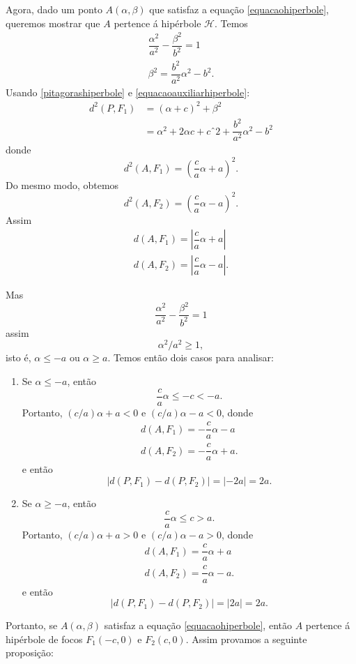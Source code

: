Agora, dado um ponto $A(\alpha,\beta)$ que satisfaz a equação \eqref{equacaohiperbole}, queremos mostrar que $A$ pertence á hipérbole $\mathcal{H}$. Temos
\begin{align}
  \dfrac{\alpha^2}{a^2} - \dfrac{\beta^2}{b^2} = 1\nonumber\\
  \beta^2 = \dfrac{b^2}{a^2}\alpha^2 - b^2.\label{equacaoauxiliarhiperbole}
\end{align}
Usando \eqref{pitagorashiperbole} e \eqref{equacaoauxiliarhiperbole}:
\begin{align*}
  d^2(P,F_1) &= (\alpha + c)^2 + \beta^2\\
  &= \alpha^2 + 2\alpha c + cˆ2 + \dfrac{b^2}{a^2}\alpha^2 - b^2
\end{align*}
donde
\[
  d^2(A,F_1) = \left(\dfrac{c}{a}\alpha + a\right)^2.
\]
Do mesmo modo, obtemos
\[
  d^2(A,F_2) = \left(\dfrac{c}{a}\alpha - a\right)^2.
\]
Assim
\begin{align}
  d(A,F_1) = \left|\dfrac{c}{a}\alpha + a\right|\\
  d(A,F_2) = \left|\dfrac{c}{a}\alpha - a\right|.
\end{align}

Mas
\[
  \dfrac{\alpha^2}{a^2} - \dfrac{\beta^2}{b^2} = 1
\]
assim
\begin{equation}\label{pontohiperbole}
  \alpha^2/a^2 \ge 1,
\end{equation}
isto é, $\alpha \le -a$ ou $\alpha \ge a$. Temos então dois casos para analisar:
\begin{enumerate}
  \item Se $\alpha \le -a$, então
  \[
    \dfrac{c}{a}\alpha \le -c < -a.
  \]
  Portanto, $(c/a)\alpha + a < 0$ e $(c/a)\alpha - a < 0$, donde
  \begin{align*}
  d(A,F_1) = -\dfrac{c}{a}\alpha - a\\
  d(A,F_2) = -\dfrac{c}{a}\alpha + a.
\end{align*}
e então
\[
  | d(P,F_1) - d(P,F_2)| = |-2a| = 2a.
\]
\item Se $\alpha \ge -a$, então
  \[
    \dfrac{c}{a}\alpha \le c > a.
  \]
  Portanto, $(c/a)\alpha + a > 0$ e $(c/a)\alpha - a > 0$, donde
  \begin{align*}
  d(A,F_1) = \dfrac{c}{a}\alpha + a\\
  d(A,F_2) = \dfrac{c}{a}\alpha - a.
\end{align*}
e então
\[
  | d(P,F_1) - d(P,F_2)| = |2a| = 2a.
\]
\end{enumerate}
Portanto, se $A(\alpha,\beta)$ satisfaz a equação \eqref{equacaohiperbole}, então $A$ pertence á hipérbole de focos $F_1(-c,0)$ e $F_2(c,0)$. Assim provamos a seguinte proposição:

